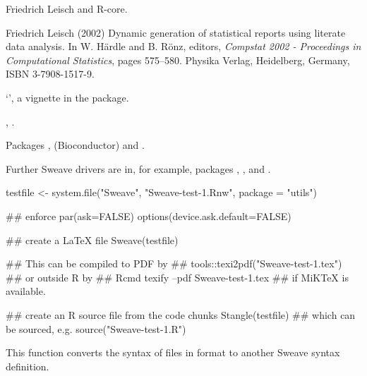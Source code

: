 %
\begin{Author}\relax
Friedrich Leisch and R-core.
\end{Author}
%
\begin{References}\relax
Friedrich Leisch (2002)
Dynamic generation of statistical reports using literate data analysis.
In W. Härdle and B. Rönz, editors,
\emph{Compstat 2002 - Proceedings in Computational Statistics},
pages 575--580. Physika Verlag, Heidelberg, Germany, ISBN 3-7908-1517-9.
\end{References}
%
\begin{SeeAlso}\relax
`', a vignette in
the  package.

, .

Packages ,  (Bioconductor) and
.

Further Sweave drivers are in, for example, packages ,
,  and .
\end{SeeAlso}
%
\begin{Examples}
\begin{ExampleCode}
testfile <- system.file("Sweave", "Sweave-test-1.Rnw", package = "utils")

## enforce par(ask=FALSE)
options(device.ask.default=FALSE)

## create a LaTeX file
Sweave(testfile)

## This can be compiled to PDF by
## tools::texi2pdf("Sweave-test-1.tex")
## or outside R by
## Rcmd texify --pdf Sweave-test-1.tex
## if MiKTeX is available.

## create an R source file from the code chunks
Stangle(testfile)
## which can be sourced, e.g.
source("Sweave-test-1.R")


\end{ExampleCode}
\end{Examples}
%
\begin{Description}\relax
This function converts the syntax of files in 
format to another Sweave syntax definition. 
\end{Description}
